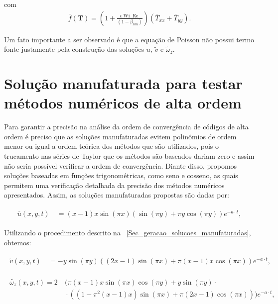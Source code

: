 com
\begin{equation}
    \begin{split}
        \overline{f}(\mathbf{T}) = \left( 1+\frac{\epsilon \operatorname{Wi} \operatorname{Re}}{(1 - \beta_{nm})}\right) \left(\overline{T}_{xx} + \overline{T}_{yy}\right).
    \end{split}\label{eq_funcao_traco_tensor_bidime_manufaturada}
\end{equation}

Um fato importante a ser observado é que a equação de Poisson não possui termo fonte justamente pela construção das soluções $\overline{u}$, $\widetilde{v}$ e $\widetilde{\omega}_{z}$.

\section{Solução manufaturada para testar métodos numéricos de alta ordem}

Para garantir a precisão na análise da ordem de convergência de códigos de alta ordem é preciso que as soluções manufaturadas evitem polinômios de ordem menor ou igual a ordem teórica dos métodos que são utilizados, pois o trucamento nas séries de Taylor que os métodos são baseados dariam zero e assim não seria possível verificar a ordem de convergência. Diante disso, propomos soluções baseadas em funções trigonométricas, como seno e cosseno, as quais permitem uma verificação detalhada da precisão dos métodos numéricos apresentados. Assim, as soluções manufaturadas propostas são dadas por:

\begin{gather}
    \begin{aligned}
        \overline{u}(x,y,t) &~= (x-1) x \sin(\pi x) \left(\sin(\pi y) + \pi y \cos(\pi y)\right) e^{-a\cdot t},\label{eq:u_case0}
    \end{aligned}
\end{gather}

Utilizando o procedimento descrito na ~\autoref{Sec_geracao_solucoes_manufaturadas}, obtemos:

\begin{gather}
    \begin{aligned}
        \widetilde{v}(x,y,t) &~= -y\sin(\pi y) \left((2x-1)\sin(\pi x) + \pi(x-1)x\cos(\pi x)\right)e^{-a\cdot t},\label{eq:v_case0}
    \end{aligned}
\end{gather}

\begin{gather}
    \begin{aligned}
        \widetilde{\omega_{z}}(x,y,t) = 2 &~ \bigg(\pi(x-1)x\sin(\pi x)\cos(\pi y) + y\sin(\pi y)\cdot \\ &~\cdot\left( (1 - \pi^2(x-1)x)\sin(\pi x) + \pi(2x-1)\cos(\pi x) \right)\bigg) e^{-a\cdot t},\label{eq:wz_case0}
    \end{aligned}
\end{gather}

